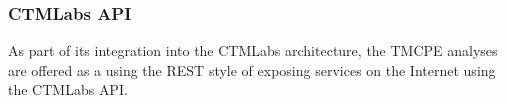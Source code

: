 \documentclass[12pt]{report}
\begin{document}




\subsubsection{CTMLabs API}
\label{sec:ctmlabs-api}

As part of its integration into the \ac{CTMLabs} architecture, the
\ac{TMCPE} analyses are offered as a using the \ac{REST} style of
exposing services on the Internet
\citep{fielding00:_archit_styles_desig_networ_softw_archit} using the
CTMLabs \ac{API}.
\end{document}

